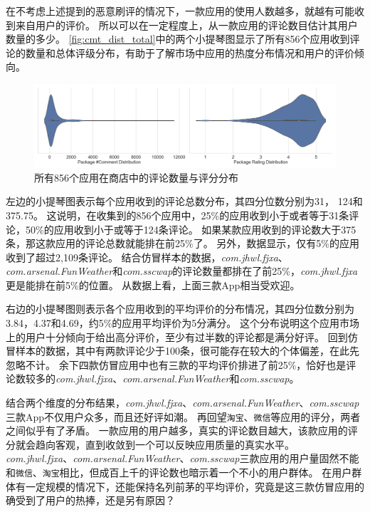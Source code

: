 在不考虑上述提到的恶意刷评的情况下，一款应用的使用人数越多，就越有可能收到来自用户的评价。
所以可以在一定程度上，从一款应用的评论数目估计其用户数量的多少。
\autoref{fig:cmt_dist_total}中的两个小提琴图显示了所有856个应用收到评论的数量和总体评级分布，有助于了解市场中应用的热度分布情况和用户的评价倾向。

%
%
%

\begin{figure}[htbp]
	\centering
	\includegraphics[width=\textwidth]{./Figures/edwin-360-comment-dist.png}
    \caption{所有856个应用在商店中的评论数量与评分分布}
    \label{fig:cmt_dist_total}
\end{figure}

左边的小提琴图表示每个应用收到的评论总数分布，其四分位数分别为31， 124和375.75。
这说明，在收集到的856个应用中，25\%的应用收到小于或者等于31条评论，50\%的应用收到小于或等于124条评论。
如果某款应用收到的评论数大于375条，那这款应用的评论总数就能排在前25\%了。
另外，数据显示，仅有5\%的应用收到了超过2,109条评论。
结合仿冒样本的数据，\emph{com.jhwl.fjxa}、\emph{com.arsenal.FunWeather}和\emph{com.sscwap}的评论数量都排在了前25\%，\emph{com.jhwl.fjxa}更是能排在前5\%的位置。
从数据上看，上面三款App相当受欢迎。

右边的小提琴图则表示各个应用收到的平均评价的分布情况，其四分位数分别为3.84，4.37和4.69，约5\%的应用平均评价为5分满分。
这个分布说明这个应用市场上的用户十分倾向于给出高分评价，至少有过半数的评论都是满分好评。
回到仿冒样本的数据，其中有两款评论少于100条，很可能存在较大的个体偏差，在此先忽略不计。
余下四款仿冒应用中也有三款的平均评价排进了前25\%，恰好也是评论数较多的\emph{com.jhwl.fjxa}、\emph{com.arsenal.FunWeather}和\emph{com.sscwap}。

结合两个维度的分布结果，\emph{com.jhwl.fjxa}、\emph{com.arsenal.FunWeather}、\emph{com.sscwap}三款App不仅用户众多，而且还好评如潮。
再回望\texttt{淘宝}、\texttt{微信}等应用的评分，两者之间似乎有了矛盾。
一款应用的用户越多，真实的评论数目越大，该款应用的评分就会趋向客观，直到收敛到一个可以反映应用质量的真实水平。
\emph{com.jhwl.fjxa}、\emph{com.arsenal.FunWeather}、\emph{com.sscwap}三款应用的用户量固然不能和\texttt{微信}、\texttt{淘宝}相比，但成百上千的评论数也暗示着一个不小的用户群体。
在用户群体有一定规模的情况下，还能保持名列前茅的平均评价，究竟是这三款仿冒应用的确受到了用户的热捧，还是另有原因？

